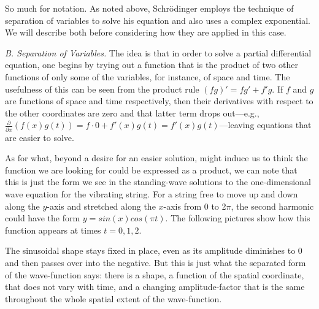 So much for notation. As noted above, Schrödinger employs the technique of separation of variables
to solve his equation and also uses a complex exponential. We will describe both before considering
how they are applied in this case.

\vspace{5pt}
\emph{B. Separation of Variables.} The idea is that in order to solve a partial differential
equation, one begins by trying out a function that is the product
of two other functions of only some of the variables, for instance, of space and time. 
The usefulness of this can be seen from the product rule $(fg)' = fg' + f'g$. If $f$ and
$g$ are functions of space and time respectively, then their derivatives with respect to
the other coordinates are zero and that latter term drops out---e.g., $\frac{\partial}{\partial x}(f(x)g(t)) =
f \cdot 0 + f'(x)g(t) = f'(x)g(t)$---leaving equations that are easier to solve.


As for what, beyond a desire for an easier solution, might induce us to think the 
function we are looking for could be expressed as a product, we can note that this is
just the form we see in the standing-wave solutions to the one-dimensional wave equation for
the vibrating string. For a string free to move up and down along the $y$-axis and stretched along the $x$-axis from 0 to 2$\pi$, the second harmonic could have the form $y = sin(x)cos(\pi t).$ The following pictures 
show how this function appears at times $t = 0, 1, 2$.
\begin{figure}[h]
  \centering
   \hspace{.2in}
   \hspace{.2in}
\end{figure}
The sinusoidal shape stays fixed in place, even as its amplitude diminishes to 0 and then passes 
over into the negative. But this is just what the separated form of the wave-function says: there 
is a shape, a function of the spatial coordinate, that does not vary with time, and a changing amplitude-factor that is the same throughout the whole spatial extent of the wave-function.

